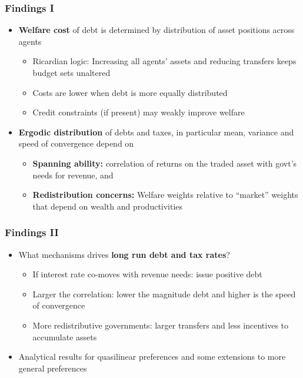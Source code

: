 \documentclass{beamer}
\begin{document}
\begin{frame}%

\frametitle{Findings I}

\begin{itemize}
\item \textbf{Welfare cost} of debt is determined by distribution of asset positions across agents

\begin{itemize}
\item Ricardian logic: Increasing all agents' assets and reducing transfers keeps budget sets unaltered
\item Costs are lower when debt is more equally distributed
\item Credit constraints (if present) may weakly improve welfare
\end{itemize}

\item \textbf{Ergodic distribution} of debts and taxes, in particular mean, variance and speed of convergence depend on

\begin{itemize}
\item \textbf{Spanning ability:} correlation of returns on the traded asset with govt's needs for revenue, and 
\item \textbf{Redistribution concerns:} Welfare weights relative to ``market'' weights that depend on wealth and productivities
\end{itemize}


\end{itemize}


\end{frame}%

\begin{frame}%
\frametitle{Findings II}
\begin{itemize}

\item What mechanisms drives \textbf{long run debt and tax rates}?

\begin{itemize}

\item If interest rate co-moves with revenue needs: issue positive debt

\item Larger the correlation: lower the magnitude debt and higher is the speed of convergence

\item More redistributive governments: larger transfers and less incentives to accumulate assets
\end{itemize}



\item  Analytical results for quasilinear preferences and some extensions to more general preferences
\end{itemize}

\end{frame}
\end{document}
